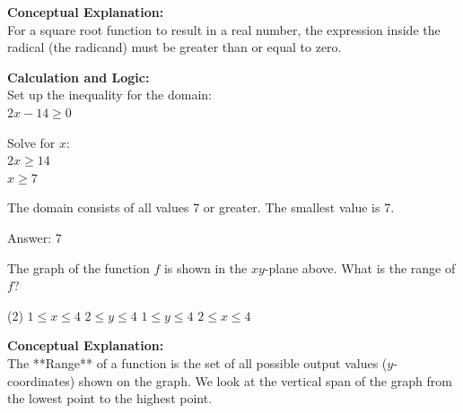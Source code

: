 \documentclass[11pt,paper=a4,answers]{exam}
\begin{document}
\begin{questions}
\begin{solution}
\textbf{Conceptual Explanation:} \\
For a square root function to result in a real number, the expression inside the radical (the radicand) must be greater than or equal to zero. 

\vspace{30pt}

\textbf{Calculation and Logic:} \\
Set up the inequality for the domain: \\
$2x - 14 \geq 0$

\vspace{15pt}

Solve for $x$: \\
$2x \geq 14$ \\
$x \geq 7$

\vspace{15pt}

The domain consists of all values 7 or greater. The smallest value is 7.

\vspace{30pt}

Answer: \colorbox{yellow!100}{7}
\end{solution}

\vspace{40pt}

\question
\begin{center}
\end{center}
The graph of the function $f$ is shown in the $xy$-plane above. What is the range of $f$?
\begin{tasks}(2)
    \task $1 \leq x \leq 4$
    \task $2 \leq y \leq 4$
    \task $1 \leq y \leq 4$
    \task $2 \leq x \leq 4$
\end{tasks}

\begin{solution}
\textbf{Conceptual Explanation:} \\
The **Range** of a function is the set of all possible output values ($y$-coordinates) shown on the graph. We look at the vertical span of the graph from the lowest point to the highest point.


\end{solution}
\end{questions}
\end{document}
